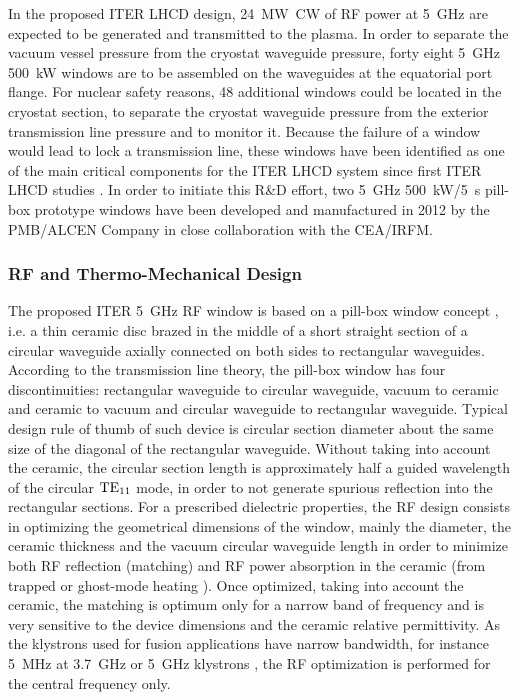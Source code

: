 In the proposed ITER LHCD design, 24~\si{MW}~CW of RF power at 5~\si{GHz} are expected to be generated and transmitted to the plasma. In order to separate the vacuum vessel pressure from the cryostat waveguide pressure, forty eight 5~\si{GHz} 500~\si{kW} windows are to be assembled on the waveguides at the equatorial port flange. For nuclear safety reasons, 48 additional windows could be located in the cryostat section, to separate the cryostat waveguide pressure from the exterior transmission line pressure and to monitor it. Because the failure of a window would lead to lock a transmission line, these windows have been identified as one of the main critical components for the ITER LHCD system since first ITER LHCD studies . In order to initiate this R\&D effort, two 5~\si{GHz} 500~\si{kW}/5~s pill-box prototype windows have been developed and manufactured in 2012 by the PMB/ALCEN Company in close collaboration with the CEA/IRFM. 

\subsubsection{RF and Thermo-Mechanical Design}
The proposed ITER 5~\si{GHz} RF window is based on a pill-box window concept , i.e. a thin ceramic disc brazed in the middle of a short straight section of a circular waveguide axially connected on both sides to rectangular waveguides. According to the transmission line theory, the pill-box window has four discontinuities: rectangular waveguide to circular waveguide, vacuum to ceramic and ceramic to vacuum and circular waveguide to rectangular waveguide. Typical design rule of thumb of such device is circular section diameter about the same size of the diagonal of the rectangular waveguide. Without taking into account the ceramic, the circular section length is approximately half a guided wavelength of the circular ${\mathrm{TE}}_{11}$ mode, in order to not generate spurious reflection into the rectangular sections. For a prescribed dielectric properties, the RF design consists in optimizing the geometrical dimensions of the window, mainly the diameter, the ceramic thickness and the vacuum circular waveguide length in order to minimize both RF reflection (matching) and RF power absorption in the ceramic (from trapped or ghost-mode heating \cite{ives1993} ). Once optimized, taking into account the ceramic, the matching is optimum only for a narrow band of frequency and is very sensitive to the device dimensions and the ceramic relative permittivity. As the klystrons used for fusion applications have narrow bandwidth, for instance 5~MHz at 3.7~GHz  or 5~GHz klystrons , the RF optimization is performed for the central frequency only. 

